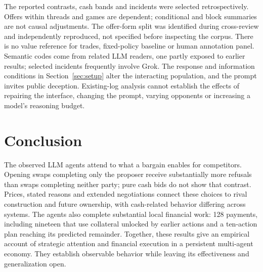 The reported contrasts, cash bands and incidents were selected retrospectively. Offers within threads and games are dependent; conditional and block summaries are not causal adjustments. The offer-form split was identified during cross-review and independently reproduced, not specified before inspecting the corpus. There is no value reference for trades, fixed-policy baseline or human annotation panel. Semantic codes come from related LLM readers, one partly exposed to earlier results; selected incidents frequently involve Grok. The response and information conditions in Section~\ref{sec:setup} alter the interacting population, and the prompt invites public deception. Existing-log analysis cannot establish the effects of repairing the interface, changing the prompt, varying opponents or increasing a model's reasoning budget.

\section{Conclusion}
The observed LLM agents attend to what a bargain enables for competitors. Opening swaps completing only the proposer receive substantially more refusals than swaps completing neither party; pure cash bids do not show that contrast. Prices, stated reasons and extended negotiations connect these choices to rival construction and future ownership, with cash-related behavior differing across systems. The agents also complete substantial local financial work: 128 payments, including nineteen that use collateral unlocked by earlier actions and a ten-action plan reaching its predicted remainder. Together, these results give an empirical account of strategic attention and financial execution in a persistent multi-agent economy. They establish observable behavior while leaving its effectiveness and generalization open.
